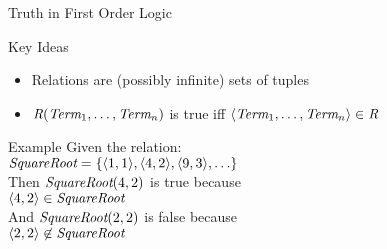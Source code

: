 \documentclass[12pt]{beamer}
\newcommand{\EM}[1]{\mbox{\em#1}}
\newcommand{\tab}{\hspace{1em}}
\begin{document}
\begin{frame}{Truth in First Order Logic}
	\begin{block}{Key Ideas}
		\begin{itemize}
			\item Relations are (possibly infinite) sets of tuples
			\item $\EM{R}(\EM{Term}_1, \ldots, \EM{Term}_n)$ is true iff
			      $\langle\EM{Term}_1, \ldots, \EM{Term}_n\rangle \in \EM{R}$
		\end{itemize}
	\end{block}
	\begin{block}{Example}
		Given the relation: \\
		\tab$\EM{SquareRoot} = \{
				\langle 1, 1 \rangle,
				\langle 4, 2 \rangle,
				\langle 9, 3 \rangle,
				\ldots \}$ \\
		\pause
		Then $\EM{SquareRoot}(4, 2)$ is \pause \alert{true} because \\
		\tab$\langle 4, 2 \rangle \in \EM{SquareRoot}$ \\
		\pause
		And $\EM{SquareRoot}(2, 2)$ is \pause \alert{false} because \\
		\tab$\langle 2, 2 \rangle \not\in \EM{SquareRoot}$
	\end{block}
\end{frame}
\end{document}
